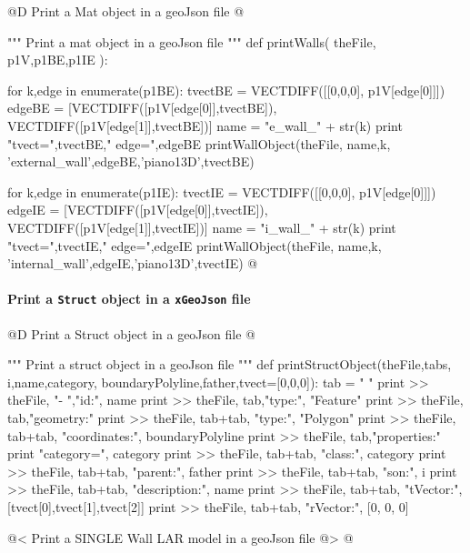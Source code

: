 \documentclass[11pt,oneside]{article}	%
\begin{document}
@D Print a Mat object in a geoJson file
@{""" Print a mat object in a geoJson file """
def printWalls( theFile, p1V,p1BE,p1IE ):
	
	for k,edge in enumerate(p1BE):
		tvectBE = VECTDIFF([[0,0,0], p1V[edge[0]]])
		edgeBE = [VECTDIFF([p1V[edge[0]],tvectBE]), VECTDIFF([p1V[edge[1]],tvectBE])]
		name = "e_wall_" + str(k)
		print "tvect=",tvectBE," edge=",edgeBE
		printWallObject(theFile, name,k, 'external_wall',edgeBE,'piano13D',tvectBE)
		
	for k,edge in enumerate(p1IE):
		tvectIE = VECTDIFF([[0,0,0], p1V[edge[0]]])
		edgeIE = [VECTDIFF([p1V[edge[0]],tvectIE]), VECTDIFF([p1V[edge[1]],tvectIE])]
		name = "i_wall_" + str(k)
		print "tvect=",tvectIE," edge=",edgeIE
		printWallObject(theFile, name,k, 'internal_wall',edgeIE,'piano13D',tvectIE)
@}

\paragraph{Print a \texttt{Struct} object in a \texttt{xGeoJson} file}

@D Print a Struct object in a geoJson file
@{""" Print a struct object in a geoJson file """
def printStructObject(theFile,tabs, i,name,category, boundaryPolyline,father,tvect=[0,0,0]):
    tab = "    "
    print >> theFile, "-   ","id:", name
    print >> theFile, tab,"type:", "Feature"
    print >> theFile, tab,"geometry:" 
    print >> theFile, tab+tab, "type:", "Polygon"
    print >> theFile, tab+tab, "coordinates:", boundaryPolyline
    print >> theFile, tab,"properties:"
    print "category=", category
    print >> theFile, tab+tab, "class:", category
    print >> theFile, tab+tab, "parent:", father
    print >> theFile, tab+tab, "son:", i
    print >> theFile, tab+tab, "description:", name
    print >> theFile, tab+tab, "tVector:", [tvect[0],tvect[1],tvect[2]]
    print >> theFile, tab+tab, "rVector:", [0, 0, 0]
    
@< Print a SINGLE Wall LAR model  in a geoJson file @>
@}
\end{document}
